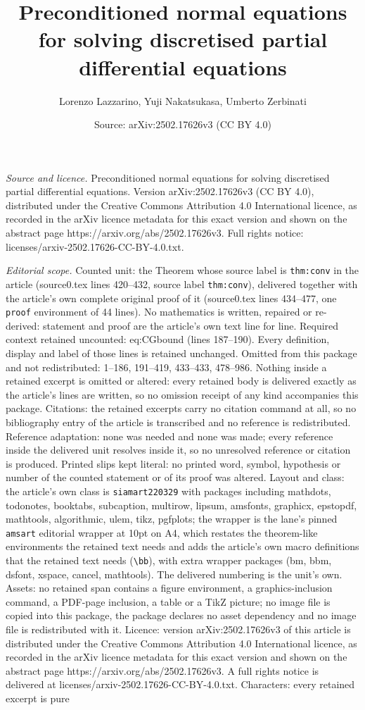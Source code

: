 \documentclass[10pt,a4paper]{amsart}
\title[Preconditioned normal equations for solving discretised part]{Preconditioned normal equations for solving discretised partial differential equations}
\author{Lorenzo Lazzarino, Yuji Nakatsukasa, Umberto Zerbinati}
\date{Source: arXiv:2502.17626v3 (CC BY 4.0)}
\begin{document}
\maketitle

\noindent\emph{Source and licence.} Preconditioned normal equations for solving discretised partial differential equations. Version arXiv:2502.17626v3 (CC BY 4.0), distributed under the Creative Commons Attribution 4.0 International licence, as recorded in the arXiv licence metadata for this exact version and shown on the abstract page https://arxiv.org/abs/2502.17626v3. Full rights notice: licenses/arxiv-2502.17626-CC-BY-4.0.txt.\par\smallskip

\noindent\textit{Editorial scope.} Counted unit: the Theorem whose source label is \texttt{thm:conv} in the article (source0.tex lines 420--432, source label \texttt{thm:conv}), delivered together with the article's own complete original proof of it (source0.tex lines 434--477, one \texttt{proof} environment of 44 lines). No mathematics is written, repaired or re-derived: statement and proof are the article's own text line for line. Required context retained uncounted: eq:CGbound (lines 187--190). Every definition, display and label of those lines is retained unchanged. Omitted from this package and not redistributed: 1--186, 191--419, 433--433, 478--986. Nothing inside a retained excerpt is omitted or altered: every retained body is delivered exactly as the article's lines are written, so no omission receipt of any kind accompanies this package. Citations: the retained excerpts carry no citation command at all, so no bibliography entry of the article is transcribed and no reference is redistributed. Reference adaptation: none was needed and none was made; every reference inside the delivered unit resolves inside it, so no unresolved reference or citation is produced. Printed slips kept literal: no printed word, symbol, hypothesis or number of the counted statement or of its proof was altered. Layout and class: the article's own class is \texttt{siamart220329} with packages including mathdots, todonotes, booktabs, subcaption, multirow, lipsum, amsfonts, graphicx, epstopdf, mathtools, algorithmic, ulem, tikz, pgfplots; the wrapper is the lane's pinned \texttt{amsart} editorial wrapper at 10pt on A4, which restates the theorem-like environments the retained text needs and adds the article's own macro definitions that the retained text needs (\texttt{\textbackslash bb}), with extra wrapper packages (bm, bbm, dsfont, xspace, cancel, mathtools). The delivered numbering is the unit's own. Assets: no retained span contains a figure environment, a graphics-inclusion command, a PDF-page inclusion, a table or a TikZ picture; no image file is copied into this package, the package declares no asset dependency and no image file is redistributed with it. Licence: version arXiv:2502.17626v3 of this article is distributed under the Creative Commons Attribution 4.0 International licence, as recorded in the arXiv licence metadata for this exact version and shown on the abstract page https://arxiv.org/abs/2502.17626v3. A full rights notice is delivered at licenses/arxiv-2502.17626-CC-BY-4.0.txt. Characters: every retained excerpt is pure 
\end{document}
